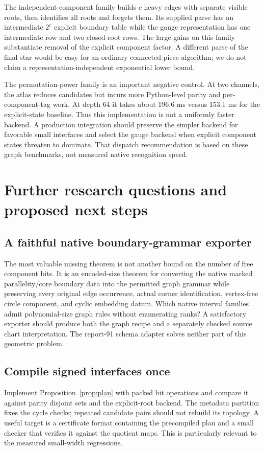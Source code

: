 \documentclass[11pt,letterpaper]{article}
\theoremstyle{definition}
\theoremstyle{remark}\newtheorem{remark}[theorem]{Remark}
\begin{document}
The independent-component family builds $c$ heavy edges with separate visible roots, then identifies all roots and forgets them. Its supplied parse has an intermediate $2^c$ explicit boundary table while the gauge representation has one intermediate row and two closed-root rows. The large gains on this family substantiate removal of the explicit component factor. A different parse of the final star would be easy for an ordinary connected-piece algorithm; we do not claim a representation-independent exponential lower bound.

The permutation-power family is an important negative control. At two channels, the atlas reduces candidates but incurs more Python-level parity and per-component-tag work. At depth 64 it takes about 196.6 ms versus 153.1 ms for the explicit-state baseline. Thus this implementation is not a uniformly faster backend. A production integration should preserve the simpler backend for favorable small interfaces and select the gauge backend when explicit component states threaten to dominate. That dispatch recommendation is based on these graph benchmarks, not measured native recognition speed.

\section{Further research questions and proposed next steps}
\label{sec:questions}
\subsection{A faithful native boundary-grammar exporter}
The most valuable missing theorem is not another bound on the number of free component bits. It is an encoded-size theorem for converting the native marked parallelity/core boundary data into the permitted graph grammar while preserving every original edge occurrence, actual corner identification, vertex-free circle component, and cyclic embedding datum. Which native interval families admit polynomial-size graph rules without enumerating ranks? A satisfactory exporter should produce both the graph recipe and a separately checked source chart interpretation. The report-91 schema adapter solves neither part of this geometric problem.

\subsection{Compile signed interfaces once}
Implement Proposition~\ref{prop:plan} with packed bit operations and compare it against parity disjoint sets and the explicit-root backend. The metadata partition fixes the cycle checks; repeated candidate pairs should not rebuild its topology. A useful target is a certificate format containing the precompiled plan and a small checker that verifies it against the quotient maps. This is particularly relevant to the measured small-width regressions.
\end{document}
